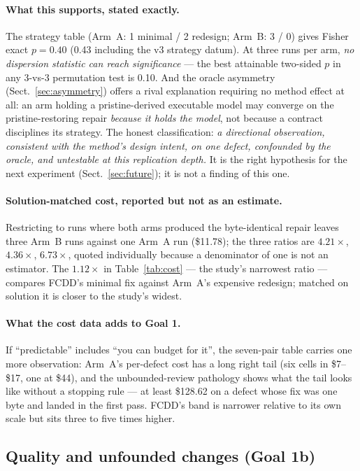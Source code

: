 \documentclass[runningheads]{llncs}
\begin{document}
\paragraph{What this supports, stated exactly.} The strategy table (Arm~A: 1
minimal / 2 redesign; Arm~B: 3 / 0) gives Fisher exact $p=0.40$ (0.43
including the v3 strategy datum). At three runs per arm, \emph{no dispersion
statistic can reach significance} --- the best attainable two-sided $p$ in
any 3-vs-3 permutation test is 0.10. And the oracle asymmetry
(Sect.~\ref{sec:asymmetry}) offers a rival explanation requiring no method
effect at all: an arm holding a pristine-derived executable model may
converge on the pristine-restoring repair \emph{because it holds the model},
not because a contract disciplines its strategy. The honest classification:
\emph{a directional observation, consistent with the method's design intent,
on one defect, confounded by the oracle, and untestable at this replication
depth.} It is the right hypothesis for the next experiment
(Sect.~\ref{sec:future}); it is not a finding of this one.

\paragraph{Solution-matched cost, reported but not as an estimate.}
Restricting to runs where both arms produced the byte-identical repair leaves
three Arm~B runs against one Arm~A run (\$11.78); the three ratios are
$4.21\times$, $4.36\times$, $6.73\times$, quoted individually because a
denominator of one is not an estimator. The $1.12\times$ in
Table~\ref{tab:cost} --- the study's narrowest ratio --- compares FCDD's
minimal fix against Arm~A's expensive redesign; matched on solution it is
closer to the study's widest.

\paragraph{What the cost data adds to Goal 1.} If ``predictable'' includes
``you can budget for it'', the seven-pair table carries one more observation:
Arm~A's per-defect cost has a long right tail (six cells in \$7--\$17, one at
\$44), and the unbounded-review pathology shows what the tail looks like
without a stopping rule --- at least \$128.62 on a defect whose fix was one
byte and landed in the first pass. FCDD's band is narrower relative to its
own scale but sits three to five times higher.

\subsection{Quality and unfounded changes (Goal 1b)}\label{sec:quality}
\end{document}
